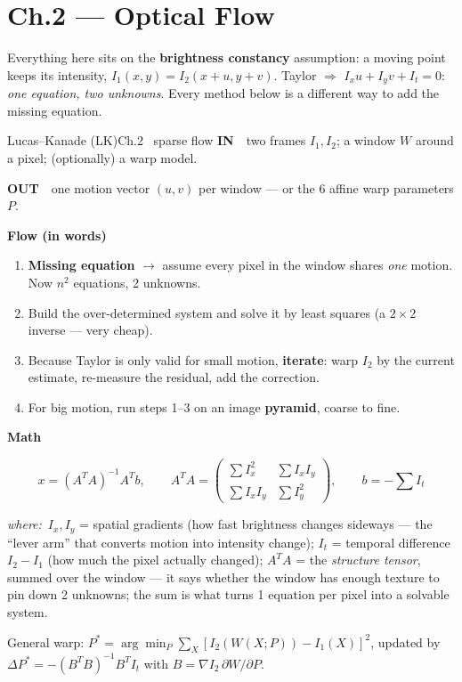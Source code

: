 \documentclass[9pt,a4paper]{extarticle}
\newcommand{\IN}{\textbf{\color{cIn}IN}\ }
\newcommand{\OUT}{\par\textbf{\color{cOut}OUT}\ }
\newcommand{\FLOW}{\par\smallskip\textbf{Flow (in words)}\par\nopagebreak}
\newcommand{\MATH}{\par\smallskip\textbf{Math}\par\nopagebreak}
\newcommand{\WHERE}{\par\textit{where:}\ }
\newcommand{\Ix}{I_x}\newcommand{\Iy}{I_y}\newcommand{\It}{I_t}
\begin{document}
\section{Ch.2 --- Optical Flow}

Everything here sits on the \textbf{brightness constancy} assumption: a moving point keeps its intensity, $I_1(x,y)=I_2(x{+}u,y{+}v)$. Taylor $\Rightarrow$ $\Ix u+\Iy v+\It=0$: \emph{one equation, two unknowns}. Every method below is a different way to add the missing equation.

\begin{card}{Lucas--Kanade (LK)}{Ch.2 \textbullet\ sparse flow}
\IN\ two frames $I_1,I_2$; a window $W$ around a pixel; (optionally) a warp model.
\OUT\ one motion vector $(u,v)$ per window --- or the 6 affine warp parameters $P$.

\FLOW
\begin{enumerate}
  \item \textbf{Missing equation} $\to$ assume every pixel in the window shares \emph{one} motion. Now $n^2$ equations, 2 unknowns.
  \item Build the over-determined system and solve it by least squares (a $2\times2$ inverse --- very cheap).
  \item Because Taylor is only valid for small motion, \textbf{iterate}: warp $I_2$ by the current estimate, re-measure the residual, add the correction.
  \item For big motion, run steps 1--3 on an image \textbf{pyramid}, coarse to fine.
\end{enumerate}

\MATH
\[ x=(A^TA)^{-1}A^Tb,\qquad A^TA=\begin{pmatrix}\sum \Ix^2 & \sum \Ix\Iy\\ \sum \Ix\Iy & \sum \Iy^2\end{pmatrix},\qquad b=-\textstyle\sum \It \]
\WHERE $\Ix,\Iy$ = spatial gradients (how fast brightness changes sideways --- the ``lever arm'' that converts motion into intensity change); $\It$ = temporal difference $I_2-I_1$ (how much the pixel actually changed); $A^TA$ = the \emph{structure tensor}, summed over the window --- it says whether the window has enough texture to pin down 2 unknowns; the sum is what turns 1 equation per pixel into a solvable system.

General warp: $P^*=\arg\min_P\sum_X[I_2(W(X;P))-I_1(X)]^2$, updated by $\Delta P^*=-(B^TB)^{-1}B^T\It$ with $B=\nabla I_2\,\partial W/\partial P$.


\end{card}
\end{document}
